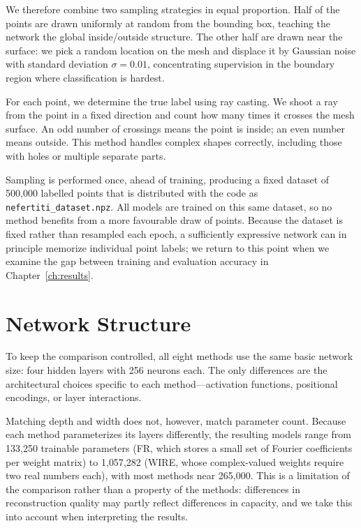 We therefore combine two sampling strategies in equal proportion. Half of the points are drawn uniformly at random from the bounding box, teaching the network the global inside/outside structure. The other half are drawn near the surface: we pick a random location on the mesh and displace it by Gaussian noise with standard deviation $\sigma = 0.01$, concentrating supervision in the boundary region where classification is hardest.

For each point, we determine the true label using ray casting. We shoot a ray from the point in a fixed direction and count how many times it crosses the mesh surface. An odd number of crossings means the point is inside; an even number means outside. This method handles complex shapes correctly, including those with holes or multiple separate parts.

Sampling is performed once, ahead of training, producing a fixed dataset of 500,000 labelled points that is distributed with the code as \texttt{nefertiti\_dataset.npz}. All models are trained on this same dataset, so no method benefits from a more favourable draw of points. Because the dataset is fixed rather than resampled each epoch, a sufficiently expressive network can in principle memorize individual point labels; we return to this point when we examine the gap between training and evaluation accuracy in Chapter~\ref{ch:results}.

\section{Network Structure}

To keep the comparison controlled, all eight methods use the same basic network size: four hidden layers with 256 neurons each. The only differences are the architectural choices specific to each method---activation functions, positional encodings, or layer interactions.

Matching depth and width does not, however, match parameter count. Because each method parameterizes its layers differently, the resulting models range from 133{,}250 trainable parameters (FR, which stores a small set of Fourier coefficients per weight matrix) to 1{,}057{,}282 (WIRE, whose complex-valued weights require two real numbers each), with most methods near 265{,}000. This is a limitation of the comparison rather than a property of the methods: differences in reconstruction quality may partly reflect differences in capacity, and we take this into account when interpreting the results.

